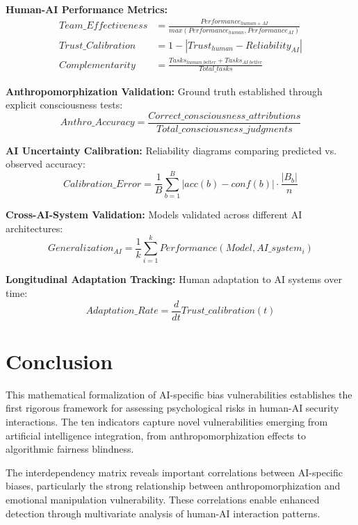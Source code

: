 \documentclass[11pt,a4paper]{article}
\begin{document}
\textbf{Human-AI Performance Metrics:}
\begin{align}
Team\_Effectiveness &= \frac{Performance_{human+AI}}{max(Performance_{human}, Performance_{AI})} \\
Trust\_Calibration &= 1 - |Trust_{human} - Reliability_{AI}| \\
Complementarity &= \frac{Tasks_{human\_better} + Tasks_{AI\_better}}{Total\_tasks}
\end{align}

\textbf{Anthropomorphization Validation:}
Ground truth established through explicit consciousness tests:
\begin{equation}
Anthro\_Accuracy = \frac{Correct\_consciousness\_attributions}{Total\_consciousness\_judgments}
\end{equation}

\textbf{AI Uncertainty Calibration:}
Reliability diagrams comparing predicted vs. observed accuracy:
\begin{equation}
Calibration\_Error = \frac{1}{B} \sum_{b=1}^{B} |acc(b) - conf(b)| \cdot \frac{|B_b|}{n}
\end{equation}

\textbf{Cross-AI-System Validation:}
Models validated across different AI architectures:
\begin{equation}
Generalization_{AI} = \frac{1}{k} \sum_{i=1}^{k} Performance(Model, AI\_system_i)
\end{equation}

\textbf{Longitudinal Adaptation Tracking:}
Human adaptation to AI systems over time:
\begin{equation}
Adaptation\_Rate = \frac{d}{dt} Trust\_calibration(t)
\end{equation}

\section{Conclusion}

This mathematical formalization of AI-specific bias vulnerabilities establishes the first rigorous framework for assessing psychological risks in human-AI security interactions. The ten indicators capture novel vulnerabilities emerging from artificial intelligence integration, from anthropomorphization effects to algorithmic fairness blindness.

The interdependency matrix reveals important correlations between AI-specific biases, particularly the strong relationship between anthropomorphization and emotional manipulation vulnerability. These correlations enable enhanced detection through multivariate analysis of human-AI interaction patterns.
\end{document}
